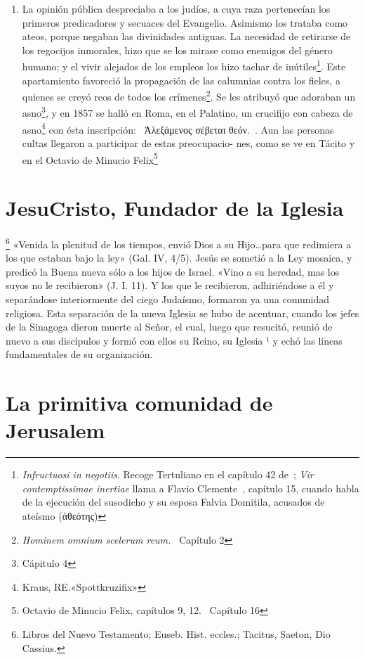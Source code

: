 \raggedbottom{} \documentclass[12pt, a4paper, openany]{book} %
\begin{document}
\begin{enumerate}
  \item La opinión pública despreciaba a los judíos, a cuya raza pertenecían los primeros predicadores y secuaces del Evangelio. Asimismo los trataba como ateos, porque negaban las divinidades antiguas. La necesidad de retirarse de los regocijos inmorales, hizo que se los mirase como enemigos del género humano; y el vivir alejados de los empleos los hizo tachar de inútiles\footnote{\textit{Infructuosi in negotiis}. Recoge Tertuliano en el capítulo 42 de~\cite{Tertuliano197Apologeticum}; \textit{Vir contemptissimae inertiae} llama a Flavio Clemente~\cite{Suetonio121DeVitaCaesarum}, capítulo 15, cuando habla de la ejecución del susodicho y su esposa Falvia Domitila, acusados de ateísmo (\textgreek{ἀθεότης})}. Este apartamiento favoreció la propagación de las calumnias contra los fieles, a quienes se creyó reos de todos los crímenes\footnote{\textit{Hominem omnium scelerum reum.}~\cite{Tertuliano197Apologeticum} Capítulo 2}. Se les atribuyó que adoraban un asno\footnote{\cite{Tertuliano197Apologeticum} Cápitulo 4},  y en 1857 se halló en Roma, en el Palatino, un crucifijo con cabeza de asno\footnote{Kraus, RE.\@ «Spottkruzifix»} con ésta inscripción: \guillemetleft\ \textgreek{Ἀλεξάμενος σέβεται θεόν.}\guillemetright\ . Aun las personas cultas llegaron a participar de estas preocupacio-
        nes, como se ve en Tácito y en el Octavio de Minucio Felix\footnote{Octavio de Minucio Felix, capítulos 9, 12.~\cite{Tertuliano197Apologeticum} Capítulo 16}
\end{enumerate}
\section{JesuCristo, Fundador de la Iglesia}
\footnote{Libros del Nuevo Testamento; Euseb. Hist. eccles.; Tacitus, Saeton, Dio Cassius.} «Venida la plenitud de los tiempos, envió Dios a su Hijo\ldots para que redimiera a los que estaban bajo la ley» (Gal. IV, 4/5). Jesús se sometió a la Ley mosaica, y predicó la Buena nueva sólo a los hijos de Israel. «Vino a su heredad, mas los suyos no le recibieron» (J. I. 11). Y los que le recibieron, adhiriéndose a él y separándose interiormente del ciego Judaísmo, formaron ya una comunidad religiosa. Esta separación de la nueva Iglesia se hubo de acentuar, cuando los jefes de la Sinagoga dieron muerte al Señor, el cual, luego que resucitó, reunió de nuevo a sus discípulos y formó con ellos su Reino, su Iglesia ¹ y echó las líneas fundamentales de su organización.
\section{La primitiva comunidad de Jerusalem}
\end{document}
